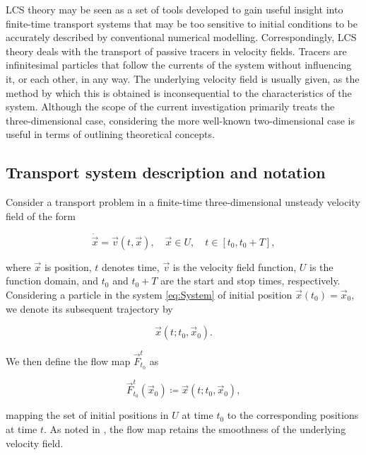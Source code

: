 LCS theory may be seen as a set of tools developed to gain useful insight into finite-time transport systems that may be too sensitive to initial conditions to be accurately described by conventional numerical modelling. Correspondingly, LCS theory deals with the transport of passive tracers in velocity fields. Tracers are infinitesimal particles that follow the currents of the system without influencing it, or each other, in any way. The underlying velocity field is usually given, as the method by which this is obtained is inconsequential to the characteristics of the system. Although the scope of the current investigation primarily treats the three-dimensional case, considering the more well-known two-dimensional case is useful in terms of outlining theoretical concepts.

\subsection{Transport system description and notation}

Consider a transport problem in a finite-time three-dimensional unsteady velocity field of the form

\begin{equation}\label{eq:System}
	\dot{\vec{x}} = \vec{v}(t,\vec{x}), \quad \vec{x}\in U,\quad t\in [ t_0, t_0+T],
\end{equation}

\noindent where $\vec{x}$ is position, $t$ denotes time, $\vec{v}$ is the velocity field function, $U$ is the function domain, and $t_0$ and $t_0+T$ are the start and stop times, respectively. Considering a particle in the system \eqref{eq:System} of initial position $\vec{x}(t_0)=\vec{x}_0$, we denote its subsequent trajectory by

\begin{equation}\label{eq:Trajectory}
	\vec{x}(t;t_0,\vec{x}_0).
\end{equation}

\noindent We then define the flow map $\vec{F}_{t_0}^t$ as

\begin{equation}\label{eq:Flowmap}
	\vec{F}_{t_0}^t(\vec{x}_0) \coloneqq \vec{x}(t;t_0,\vec{x}_0),
\end{equation}

\noindent mapping the set of initial positions in $U$ at time $t_0$ to the corresponding positions at time $t$. As noted in \cite{LCSreview}, the flow map retains the smoothness of the underlying velocity field.

